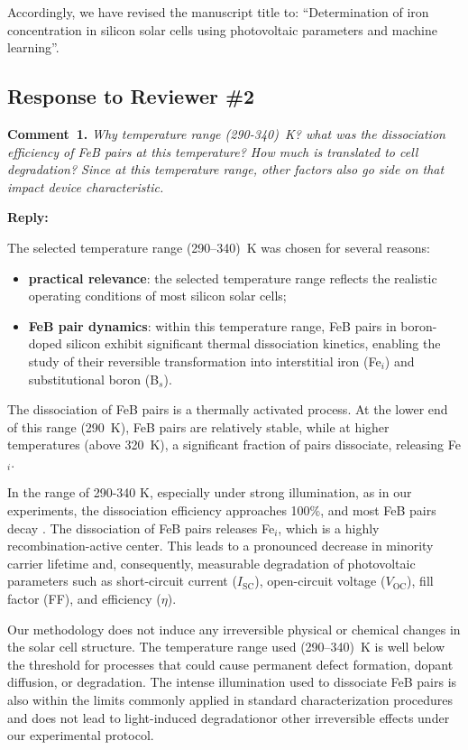 \documentclass[a4paper,fleqn]{cas-sc}
\begin{document}
Accordingly, we have revised the manuscript title to:
“Determination of iron concentration in silicon solar cells using photovoltaic parameters and machine learning”.

\vspace{1cm}
\subsection*{Response to Reviewer \#2 }

\noindent
\textcolor[rgb]{0.00,0.50,1.00}{\textbf{Comment~1.}}
\emph{Why temperature range (290-340)~K? what was the dissociation efficiency of FeB pairs at this temperature? How much is translated to cell degradation? Since at this temperature range, other factors also go side on that impact device characteristic.}


\noindent
\textcolor[rgb]{0.51,0.00,0.00}{\textbf{Reply:}}

The selected temperature range (290–340)~K was chosen for several reasons:
\begin{itemize}
    \item \textbf{practical relevance}: the selected temperature range reflects the realistic operating conditions of most silicon solar cells;
    \item \textbf{FeB pair dynamics}: within this temperature range, FeB pairs in boron-doped silicon exhibit significant thermal dissociation kinetics, enabling the study of their reversible transformation into interstitial iron (Fe$_i$) and substitutional boron (B$_s$).
\end{itemize}

The dissociation of FeB pairs is a thermally activated process. At the lower end of this range (290~K), FeB pairs are relatively stable, while at higher temperatures (above 320~K), a significant fraction of pairs dissociate, releasing Fe$_i$.
\cite{istratov1999}

In the range of 290-340 K, especially under strong illumination, as in our experiments, the dissociation efficiency approaches 100\%, and most FeB pairs decay \cite{istratov1999}. The dissociation of FeB pairs releases Fe$_i$, which is a highly recombination-active center. This leads to a pronounced decrease in minority carrier lifetime and, consequently, measurable degradation of photovoltaic parameters such as short-circuit current ($I_\mathrm{SC}$), open-circuit voltage ($V_\mathrm{OC}$), fill factor (FF), and efficiency ($\eta$).

Our methodology does not induce any irreversible physical or chemical changes in the solar cell structure. 
The temperature range used (290–340)~K is well below the threshold for processes that could cause permanent defect formation, dopant diffusion, or degradation. 
The intense illumination used to dissociate FeB pairs is also within the limits commonly applied in standard characterization procedures and does not lead to light-induced degradationor other irreversible effects under our experimental protocol.
\end{document}
